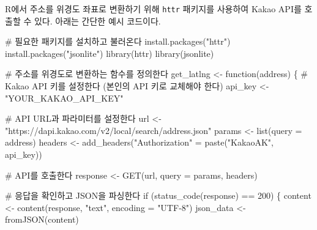 \documentclass[
  letterpaper,
]{book}
\newenvironment{Shaded}{\begin{snugshade}}{\end{snugshade}}
\newcommand{\AttributeTok}[1]{\textcolor[rgb]{0.40,0.45,0.13}{#1}}
\newcommand{\CommentTok}[1]{\textcolor[rgb]{0.37,0.37,0.37}{#1}}
\newcommand{\ControlFlowTok}[1]{\textcolor[rgb]{0.00,0.23,0.31}{#1}}
\newcommand{\DecValTok}[1]{\textcolor[rgb]{0.68,0.00,0.00}{#1}}
\newcommand{\FunctionTok}[1]{\textcolor[rgb]{0.28,0.35,0.67}{#1}}
\newcommand{\NormalTok}[1]{\textcolor[rgb]{0.00,0.23,0.31}{#1}}
\newcommand{\OtherTok}[1]{\textcolor[rgb]{0.00,0.23,0.31}{#1}}
\newcommand{\SpecialCharTok}[1]{\textcolor[rgb]{0.37,0.37,0.37}{#1}}
\newcommand{\StringTok}[1]{\textcolor[rgb]{0.13,0.47,0.30}{#1}}
\begin{document}
\begin{tcolorbox}[enhanced jigsaw, opacityback=0, opacitybacktitle=0.6, colback=white, rightrule=.15mm, coltitle=black, colframe=quarto-callout-note-color-frame, colbacktitle=quarto-callout-note-color!10!white, bottomrule=.15mm, bottomtitle=1mm, breakable, title=\textcolor{quarto-callout-note-color}{\faInfo}\hspace{0.5em}{주소를 넘기면 위경도 좌표를 반환하는 R 코드를 작성해줘.}, titlerule=0mm, leftrule=.75mm, toptitle=1mm, left=2mm, arc=.35mm, toprule=.15mm]

R에서 주소를 위경도 좌표로 변환하기 위해 \texttt{httr} 패키지를 사용하여
Kakao API를 호출할 수 있다. 아래는 간단한 예시 코드이다.

\begin{Shaded}
\begin{Highlighting}[]
\CommentTok{\# 필요한 패키지를 설치하고 불러온다}
\FunctionTok{install.packages}\NormalTok{(}\StringTok{"httr"}\NormalTok{)}
\FunctionTok{install.packages}\NormalTok{(}\StringTok{"jsonlite"}\NormalTok{)}
\FunctionTok{library}\NormalTok{(httr)}
\FunctionTok{library}\NormalTok{(jsonlite)}

\CommentTok{\# 주소를 위경도로 변환하는 함수를 정의한다}
\NormalTok{get\_latlng }\OtherTok{\textless{}{-}} \ControlFlowTok{function}\NormalTok{(address) \{}
  \CommentTok{\# Kakao API 키를 설정한다 (본인의 API 키로 교체해야 한다)}
\NormalTok{  api\_key }\OtherTok{\textless{}{-}} \StringTok{"YOUR\_KAKAO\_API\_KEY"}
  
  \CommentTok{\# API URL과 파라미터를 설정한다}
\NormalTok{  url }\OtherTok{\textless{}{-}} \StringTok{"https://dapi.kakao.com/v2/local/search/address.json"}
\NormalTok{  params }\OtherTok{\textless{}{-}} \FunctionTok{list}\NormalTok{(}\AttributeTok{query =}\NormalTok{ address)}
\NormalTok{  headers }\OtherTok{\textless{}{-}} \FunctionTok{add\_headers}\NormalTok{(}\StringTok{"Authorization"} \OtherTok{=} \FunctionTok{paste}\NormalTok{(}\StringTok{"KakaoAK"}\NormalTok{, api\_key))}
  
  \CommentTok{\# API를 호출한다}
\NormalTok{  response }\OtherTok{\textless{}{-}} \FunctionTok{GET}\NormalTok{(url, }\AttributeTok{query =}\NormalTok{ params, headers)}
  
  \CommentTok{\# 응답을 확인하고 JSON을 파싱한다}
  \ControlFlowTok{if}\NormalTok{ (}\FunctionTok{status\_code}\NormalTok{(response) }\SpecialCharTok{==} \DecValTok{200}\NormalTok{) \{}
\NormalTok{    content }\OtherTok{\textless{}{-}} \FunctionTok{content}\NormalTok{(response, }\StringTok{"text"}\NormalTok{, }\AttributeTok{encoding =} \StringTok{"UTF{-}8"}\NormalTok{)}
\NormalTok{    json\_data }\OtherTok{\textless{}{-}} \FunctionTok{fromJSON}\NormalTok{(content)}
    

\end{Highlighting}
\end{Shaded}
\end{tcolorbox}
\end{document}

